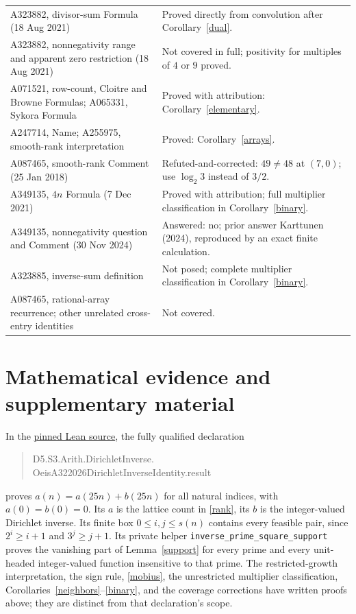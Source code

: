 \documentclass[11pt]{article}
\begin{document}
\begin{longtable}{@{}>{\raggedright\arraybackslash}p{.46\linewidth}>{\raggedright\arraybackslash}p{.49\linewidth}@{}}
A323882, divisor-sum Formula (18 Aug 2021) & Proved directly from convolution after Corollary~\ref{dual}. \\
A323882, nonnegativity range and apparent zero restriction (18 Aug 2021) & Not covered in full; positivity for multiples of $4$ or $9$ proved. \\
A071521, row-count, Cloitre and Browne Formulas; A065331, Sykora Formula & Proved with attribution: Corollary~\ref{elementary}. \\
A247714, Name; A255975, smooth-rank interpretation & Proved: Corollary~\ref{arrays}. \\
A087465, smooth-rank Comment (25 Jan 2018) & Refuted-and-corrected: $49\ne48$ at $(7,0)$; use $\log_2 3$ instead of $3/2$. \\
A349135, $4n$ Formula (7 Dec 2021) & Proved with attribution; full multiplier classification in Corollary~\ref{binary}. \\
A349135, nonnegativity question and Comment (30 Nov 2024) & Answered: no; prior answer Karttunen (2024), reproduced by an exact finite calculation. \\
A323885, inverse-sum definition & Not posed; complete multiplier classification in Corollary~\ref{binary}. \\
A087465, rational-array recurrence; other unrelated cross-entry identities & Not covered. \\
\bottomrule
\end{longtable}
\normalsize

\section{Mathematical evidence and supplementary material}
In the \href{https://github.com/the-omega-institute/trureturing/blob/e0da8fcc80226febc4e7ea0836927bc71d158292/D5/S3/Arith/DirichletInverse/OeisA322026DirichletInverseIdentity.lean}{pinned Lean source},
the fully qualified declaration
\begin{quote}\small\ttfamily
D5.S3.Arith.DirichletInverse.\\
OeisA322026DirichletInverseIdentity.result
\end{quote}
proves
$a(n)=a(25n)+b(25n)$ for all natural indices, with $a(0)=b(0)=0$.
Its $a$ is the lattice count in \eqref{rank}, its $b$ is the
integer-valued Dirichlet inverse. Its finite box
$0\leq i,j\leq s(n)$ contains every feasible pair, since
$2^i\geq i+1$ and $3^j\geq j+1$. Its private helper
\texttt{inverse\_prime\_square\_support} proves the vanishing part of
Lemma~\ref{support} for every prime and every unit-headed integer-valued
function insensitive to that prime. The restricted-growth interpretation,
the sign rule, \eqref{mobius}, the unrestricted multiplier classification,
Corollaries~\ref{neighbors}--\ref{binary}, and the coverage corrections
have written proofs above; they are distinct from that declaration's scope.
\end{document}
